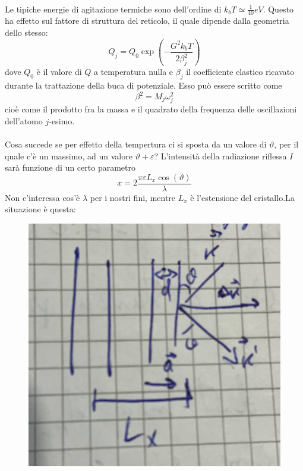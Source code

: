\documentclass{book}
\begin{document}
        \paragraph{}
        Le tipiche energie di agitazione termiche sono dell'ordine di $k_{b}T \simeq \frac{1}{40}eV$.
        Questo ha effetto sul fattore di struttura del reticolo, il quale dipende dalla geometria dello stesso:
        $$Q_{j} = Q_{0}\exp{(-\frac{G^{2}k_{b}T}{2\beta_{j} ^{2}})}$$
        dove $Q_{0}$ è il valore di $Q$ a temperatura nulla e $\beta_{j}$ il coefficiente elastico ricavato durante la trattazione della buca di potenziale. Esso può essere scritto come
        $$\beta^{2} = M_{j}\omega_{j} ^{2}$$
        cioè come il prodotto fra la massa e il quadrato della frequenza delle oscillazioni dell'atomo $j$-esimo.

        \paragraph{}
            Cosa succede se per effetto della tempertura ci si sposta da un valore di $\vartheta$, per il quale c'è un massimo, ad un valore $\vartheta + \varepsilon$? \newline
            L'intensità della radiazione riflessa $I$ sarà funzione di un certo parametro
            $$x = 2 \frac{\pi \varepsilon L_{x} \cos{(\vartheta)}}{\lambda}$$
            \newpage
            Non c'interessa cos'è $\lambda$ per i nostri fini, mentre $L_{x}$ è l'estensione del cristallo.La situazione è questa:
            \begin{figure}[h!]
                \centering
                \includegraphics[width=0.5\linewidth]{img/cristalloOscillazioniLez9.png}
            \end{figure}
\end{document}
